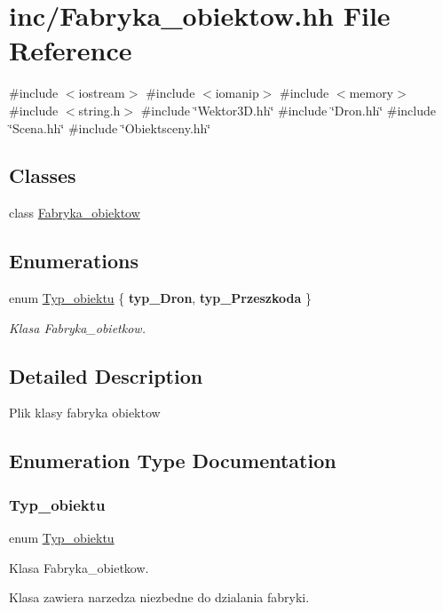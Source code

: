 \hypertarget{_fabryka__obiektow_8hh}{}\section{inc/\+Fabryka\+\_\+obiektow.hh File Reference}
\label{_fabryka__obiektow_8hh}
{\ttfamily \#include $<$iostream$>$}\newline
{\ttfamily \#include $<$iomanip$>$}\newline
{\ttfamily \#include $<$memory$>$}\newline
{\ttfamily \#include $<$string.\+h$>$}\newline
{\ttfamily \#include \char`\"{}Wektor3\+D.\+hh\char`\"{}}\newline
{\ttfamily \#include \char`\"{}Dron.\+hh\char`\"{}}\newline
{\ttfamily \#include \char`\"{}Scena.\+hh\char`\"{}}\newline
{\ttfamily \#include \char`\"{}Obiektsceny.\+hh\char`\"{}}\newline
\subsection*{Classes}
\begin{DoxyCompactItemize}
\item 
class \mbox{\hyperlink{class_fabryka__obiektow}{Fabryka\+\_\+obiektow}}
\end{DoxyCompactItemize}
\subsection*{Enumerations}
\begin{DoxyCompactItemize}
\item 
enum \mbox{\hyperlink{_fabryka__obiektow_8hh_a9501853a2db8f8cc2c341b021578862c}{Typ\+\_\+obiektu}} \{ {\bfseries typ\+\_\+\+Dron}, 
{\bfseries typ\+\_\+\+Przeszkoda}
 \}
\begin{DoxyCompactList}\small\item\em Klasa Fabryka\+\_\+obietkow. \end{DoxyCompactList}\end{DoxyCompactItemize}


\subsection{Detailed Description}
Plik klasy fabryka obiektow 

\subsection{Enumeration Type Documentation}
\mbox{\label{_fabryka__obiektow_8hh_a9501853a2db8f8cc2c341b021578862c}} 
\subsubsection{\texorpdfstring{Typ\_obiektu}{Typ\_obiektu}}
{\footnotesize\ttfamily enum \mbox{\hyperlink{_fabryka__obiektow_8hh_a9501853a2db8f8cc2c341b021578862c}{Typ\+\_\+obiektu}}}



Klasa Fabryka\+\_\+obietkow. 

Klasa zawiera narzedza niezbedne do dzialania fabryki. 